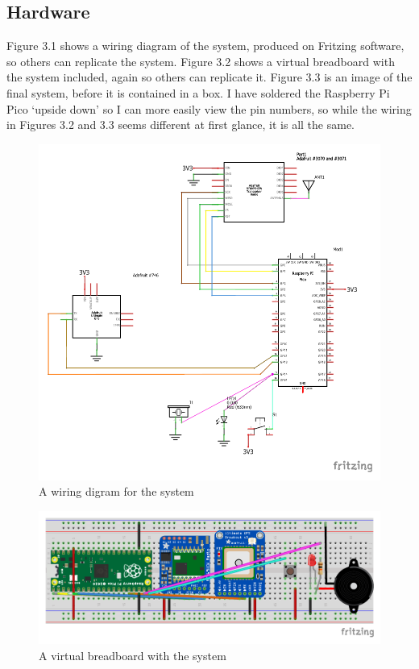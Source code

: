 \documentclass[12pt,a4paper]{report}
\begin{document}
\subsection{Hardware}
Figure 3.1 shows a wiring diagram of the system, produced on Fritzing software, so others can replicate the system. Figure 3.2 shows a virtual breadboard with the system included, again so others can replicate it. Figure 3.3 is an image of the final system, before it is contained in a box. I have soldered the Raspberry Pi Pico `upside down' so I can more easily view the pin numbers, so while the wiring in Figures 3.2 and 3.3 seems different at first glance, it is all the same. 
\begin{figure}[h]
\begin{center}
\includegraphics[scale=0.8]{wiring.pdf}
\end{center}
\caption{A wiring digram for the system}
\end{figure}

\begin{figure}[h]
\begin{center}
\includegraphics{breadboard.pdf}
\end{center}
\caption{A virtual breadboard with the system}
\end{figure}
\end{document}
